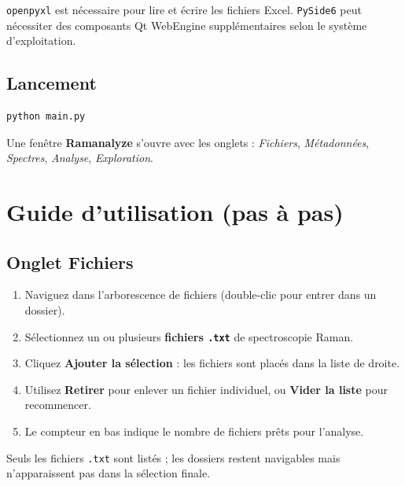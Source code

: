 \documentclass[12pt, a4paper]{article}
\begin{document}
\begin{remarque}
\texttt{openpyxl} est nécessaire pour lire et écrire les fichiers Excel.
\texttt{PySide6} peut nécessiter des composants Qt WebEngine supplémentaires
selon le système d'exploitation.
\end{remarque}

\subsection{Lancement}

\begin{lstlisting}[language=bash]
python main.py
\end{lstlisting}

Une fenêtre \textbf{Ramanalyze} s'ouvre avec les onglets : \textit{Fichiers},
\textit{Métadonnées}, \textit{Spectres}, \textit{Analyse}, \textit{Exploration}.

\section{Guide d'utilisation (pas à pas)}

\subsection{Onglet Fichiers}

\begin{enumerate}
  \item Naviguez dans l'arborescence de fichiers (double-clic pour entrer dans
        un dossier).
  \item Sélectionnez un ou plusieurs \textbf{fichiers \texttt{.txt}} de
        spectroscopie Raman.
  \item Cliquez \textbf{Ajouter la sélection} : les fichiers sont placés dans
        la liste de droite.
  \item Utilisez \textbf{Retirer} pour enlever un fichier individuel, ou
        \textbf{Vider la liste} pour recommencer.
  \item Le compteur en bas indique le nombre de fichiers prêts pour l'analyse.
\end{enumerate}

\begin{remarque}
Seuls les fichiers \texttt{.txt} sont listés ; les dossiers restent navigables
mais n'apparaissent pas dans la sélection finale.
\end{remarque}
\end{document}
